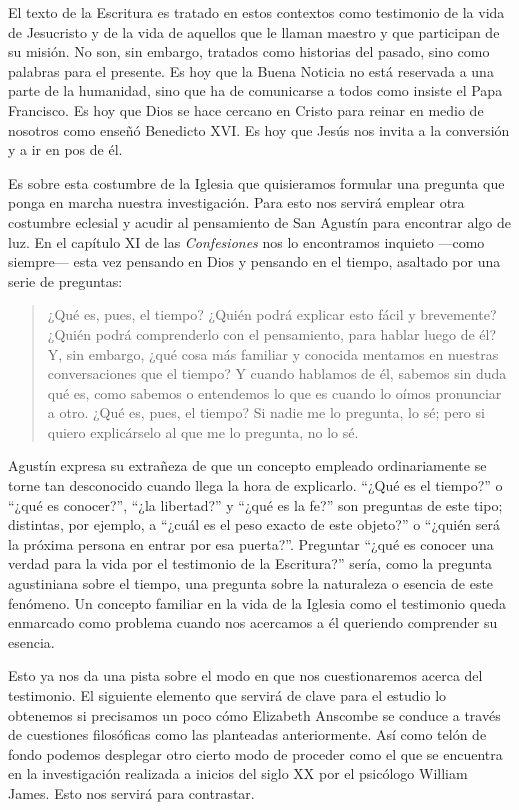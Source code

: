 El texto de la Escritura es tratado en estos contextos como testimonio de la
vida de Jesucristo y de la vida de aquellos que le llaman maestro y que
participan de su misión. No son, sin embargo, tratados como historias del
pasado, sino como palabras para el presente. Es hoy que la Buena Noticia no está
reservada a una parte de la humanidad, sino que ha de comunicarse a todos como
insiste el Papa Francisco. Es hoy que Dios se hace cercano en Cristo para reinar
en medio de nosotros como enseñó Benedicto XVI. Es hoy que Jesús nos invita a la
conversión y a ir en pos de él.

Es sobre esta costumbre de la Iglesia que quisieramos formular una pregunta que
ponga en marcha nuestra investigación. Para esto nos servirá emplear otra
costumbre eclesial y acudir al pensamiento de San Agustín para encontrar algo de
luz. En el capítulo XI de las \emph{Confesiones} nos lo encontramos inquieto
---como siempre--- esta vez pensando en Dios y pensando en el tiempo, asaltado
por una serie de preguntas:

\blockquote[{\cite[XI.14 n.17]{confesiones}}]{¿Qué es, pues, el tiempo? ¿Quién
  podrá explicar esto fácil y brevemente? ¿Quién podrá comprenderlo con el
  pensamiento, para hablar luego de él? Y, sin embargo, ¿qué cosa más familiar y
  conocida mentamos en nuestras conversaciones que el tiempo? Y cuando hablamos
  de él, sabemos sin duda qué es, como sabemos o entendemos lo que es cuando lo
  oímos pronunciar a otro. ¿Qué es, pues, el tiempo? Si nadie me lo pregunta, lo
  sé; pero si quiero explicárselo al que me lo pregunta, no lo sé.}

Agustín expresa su extrañeza de que un concepto empleado ordinariamente se torne
tan desconocido cuando llega la hora de explicarlo. \enquote{¿Qué es el tiempo?}
o \enquote{¿qué es conocer?}, \enquote{¿la libertad?} y \enquote{¿qué es la fe?}
son preguntas de este tipo; distintas, por ejemplo, a \enquote{¿cuál es el peso
  exacto de este objeto?} o \enquote{¿quién será la próxima persona en entrar
  por esa puerta?}.\autocite[Cf.][304]{wittgenstein2005bt} Preguntar
\enquote{¿qué es conocer una verdad para la vida por el testimonio de la
  Escritura?} sería, como la pregunta agustiniana sobre el tiempo, una pregunta
sobre la naturaleza o esencia de este fenómeno. Un concepto familiar en la vida
de la Iglesia como el testimonio queda enmarcado como problema cuando nos
acercamos a él queriendo comprender su esencia.

Esto ya nos da una pista sobre el modo en que nos cuestionaremos acerca del
testimonio. El siguiente elemento que servirá de clave para el estudio lo
obtenemos si precisamos un poco cómo Elizabeth Anscombe se conduce a través de
cuestiones filosóficas como las planteadas anteriormente. Así como telón de
fondo podemos desplegar otro cierto modo de proceder como el que se encuentra en
la investigación realizada a inicios del siglo XX por el psicólogo William
James. Esto nos servirá para contrastar.

